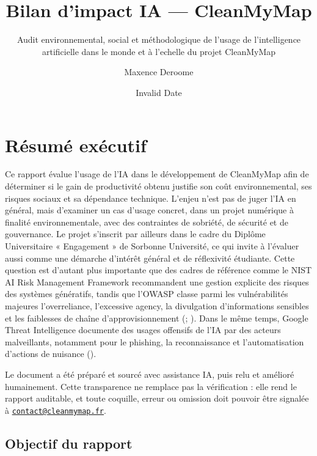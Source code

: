\documentclass[
  10pt,
  a4paper,
  DIV=11,
  numbers=noendperiod,
  oneside]{scrreprt}
\title{Bilan d'impact IA --- CleanMyMap}
\subtitle{Audit environnemental, social et méthodologique de l'usage de
l'intelligence artificielle dans le monde et à l'echelle du projet
CleanMyMap}
\author{Maxence Deroome}
\date{Invalid Date}
\renewcommand*\contentsname{Table of contents}
\newcommand\contentsname{Table of contents}
\begin{document}
\maketitle

\renewcommand*\contentsname{Sommaire}
{
\setcounter{tocdepth}{3}
\tableofcontents
}

\newpage{}

\chapter*{Résumé exécutif}\label{ruxe9sumuxe9-exuxe9cutif}

Ce rapport évalue l'usage de l'IA dans le développement de CleanMyMap
afin de déterminer si le gain de productivité obtenu justifie son coût
environnemental, ses risques sociaux et sa dépendance technique. L'enjeu
n'est pas de juger l'IA en général, mais d'examiner un cas d'usage
concret, dans un projet numérique à finalité environnementale, avec des
contraintes de sobriété, de sécurité et de gouvernance. Le projet
s'inscrit par ailleurs dans le cadre du Diplôme Universitaire «
Engagement » de Sorbonne Université, ce qui invite à l'évaluer aussi
comme une démarche d'intérêt général et de réflexivité étudiante. Cette
question est d'autant plus importante que des cadres de référence comme
le NIST AI Risk Management Framework recommandent une gestion explicite
des risques des systèmes génératifs, tandis que l'OWASP classe parmi les
vulnérabilités majeures l'overreliance, l'excessive agency, la
divulgation d'informations sensibles et les faiblesses de chaîne
d'approvisionnement (;
). Dans le même
temps, Google Threat Intelligence documente des usages offensifs de l'IA
par des acteurs malveillants, notamment pour le phishing, la
reconnaissance et l'automatisation d'actions de nuisance
().

Le document a été préparé et sourcé avec assistance IA, puis relu et
amélioré humainement. Cette transparence ne remplace pas la vérification
: elle rend le rapport auditable, et toute coquille, erreur ou omission
doit pouvoir être signalée à
\href{mailto:contact@cleanmymap.fr}{\nolinkurl{contact@cleanmymap.fr}}.

\section{Objectif du rapport}\label{objectif-du-rapport}
\end{document}
